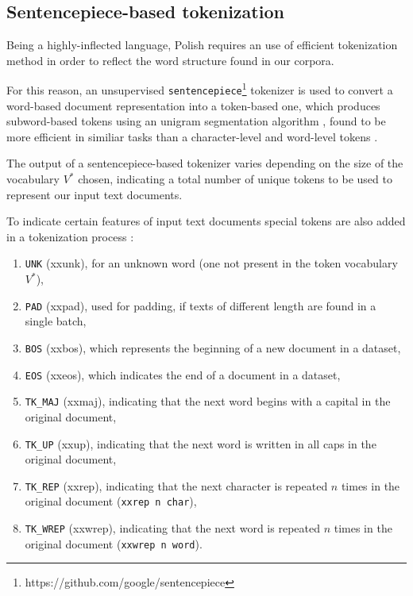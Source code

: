 \subsection{Sentencepiece-based tokenization}
\label{sentencepiece:tokenizer}

Being a highly-inflected language, Polish requires an use of efficient tokenization method in order to reflect the word structure found in our corpora. 


For this reason, an unsupervised \lstinline{sentencepiece}\footnote{https://github.com/google/sentencepiece} tokenizer is used to convert a word-based document representation into a token-based one, which produces subword-based tokens using an unigram segmentation algorithm \cite{kudo:subword}, found to be more efficient in similiar tasks than a character-level and word-level tokens \cite{czaplakardas:ulmfit}.

The output of a sentencepiece-based tokenizer varies depending on the size of the vocabulary $V^*$ chosen, indicating a total number of unique tokens to be used to represent our input text documents.

To indicate certain features of input text documents special tokens are also added in a tokenization process \cite{fastai:docs}:

\begin{enumerate}
\item \lstinline{UNK} (xxunk), for an unknown word (one not present in the token vocabulary $V^*$),
\item \lstinline{PAD} (xxpad), used for padding, if texts of different length are found in a single batch,
\item \lstinline{BOS} (xxbos), which represents the beginning of a new document in a dataset,
\item \lstinline{EOS} (xxeos), which indicates the end of a document in a dataset,
\item \lstinline{TK_MAJ} (xxmaj), indicating that the next word begins with a capital in the original document,
\item \lstinline{TK_UP} (xxup), indicating that the next word is written in all caps in the original document,
\item \lstinline{TK_REP} (xxrep), indicating that the next character is repeated $n$ times in the original document (\lstinline{xxrep n char}),
\item \lstinline{TK_WREP} (xxwrep), indicating that the next word is repeated $n$ times in the original document (\lstinline{xxwrep n word}).
\end{enumerate}

